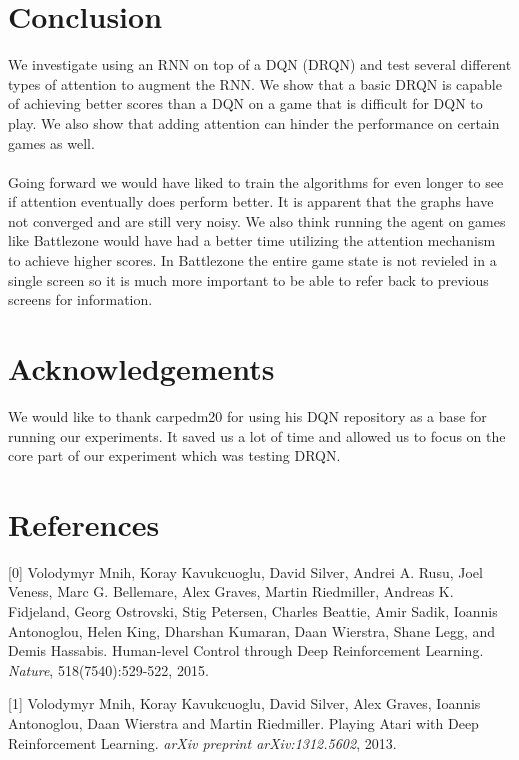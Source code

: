 \documentclass{article}
\begin{document}
\section*{Conclusion}

We investigate using an RNN on top of a DQN (DRQN) and test several different types
of attention to augment the RNN. We show that a basic DRQN is capable of achieving
better scores than a DQN on a game that is difficult for DQN to play. We also
show that adding attention can hinder the performance on certain games as well. \\
\\
Going forward we would have liked to train the algorithms for even longer to see
if attention eventually does perform better. It is apparent that the graphs have
not converged and are still very noisy. We also think running the agent on games
like Battlezone would have had a better time utilizing the attention mechanism to
achieve higher scores. In Battlezone the entire game state is not revieled in a
single screen so it is much more important to be able to refer back to previous
screens for information.

\section*{Acknowledgements}

We would like to thank carpedm20 for using his DQN repository as a base for
running our experiments. It saved us a lot of time and allowed us to focus on the
core part of our experiment which was testing DRQN.

\section*{References}
\small
[0] Volodymyr Mnih, Koray Kavukcuoglu, David Silver, Andrei A. Rusu, Joel Veness, Marc G. Bellemare, Alex Graves, Martin Riedmiller, Andreas K. Fidjeland, Georg Ostrovski, Stig Petersen, Charles Beattie, Amir Sadik, Ioannis Antonoglou, Helen King, Dharshan Kumaran, Daan Wierstra, Shane Legg, and Demis Hassabis. Human-level Control through Deep Reinforcement Learning. {\it Nature}, 518(7540):529-522, 2015.

[1] Volodymyr Mnih, Koray Kavukcuoglu, David Silver, Alex Graves, Ioannis Antonoglou, Daan Wierstra and Martin Riedmiller. Playing Atari with Deep Reinforcement Learning. {\it arXiv preprint arXiv:1312.5602}, 2013.
\end{document}
